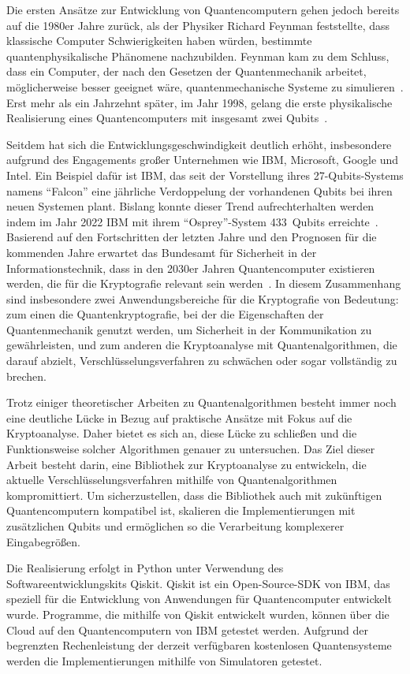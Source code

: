 \documentclass[lettersize,journal]{IEEEtran}
\begin{document}
Die ersten Ansätze zur Entwicklung von Quantencomputern gehen jedoch bereits auf die 1980er Jahre zurück,
als der Physiker Richard Feynman feststellte,
dass klassische Computer Schwierigkeiten haben würden,
bestimmte quantenphysikalische Phänomene nachzubilden.
Feynman kam zu dem Schluss, dass ein Computer,
der nach den Gesetzen der Quantenmechanik arbeitet,
möglicherweise besser geeignet wäre,
quantenmechanische Systeme zu simulieren~\cite{Feynman:1982}.
Erst mehr als ein Jahrzehnt später, im Jahr 1998,
gelang die erste physikalische Realisierung eines Quantencomputers
mit insgesamt zwei Qubits~\cite{Chuang:1998ExperimentalIO}.

Seitdem hat sich die Entwicklungsgeschwindigkeit deutlich erhöht,
insbesondere aufgrund des Engagements großer Unternehmen wie IBM, Microsoft, Google und Intel.
Ein Beispiel dafür ist IBM,
das seit der Vorstellung ihres 27-Qubits-Systems namens "`Falcon"'
eine jährliche Verdoppelung der vorhandenen Qubits bei ihren neuen Systemen plant.
Bislang konnte dieser Trend aufrechterhalten werden
indem im Jahr 2022 IBM mit ihrem "`Osprey"'-System 433~Qubits erreichte~\cite{IBM:2022}.
Basierend auf den Fortschritten der letzten Jahre und
den Prognosen für die kommenden Jahre erwartet
das Bundesamt für Sicherheit in der Informationstechnik,
dass in den 2030er Jahren Quantencomputer existieren werden,
die für die Kryptografie relevant sein werden~\cite{BSI:2023}.
In diesem Zusammenhang sind insbesondere zwei Anwendungsbereiche für die Kryptografie von Bedeutung:
zum einen die Quantenkryptografie, bei der die Eigenschaften der Quantenmechanik genutzt werden,
um Sicherheit in der Kommunikation zu gewährleisten, und
zum anderen die Kryptoanalyse mit Quantenalgorithmen, die darauf abzielt,
Verschlüsselungsverfahren zu schwächen oder sogar vollständig zu brechen.

Trotz einiger theoretischer Arbeiten zu Quantenalgorithmen
besteht immer noch eine deutliche Lücke in Bezug auf praktische Ansätze mit Fokus auf die Kryptoanalyse.
Daher bietet es sich an, diese Lücke zu schließen und die Funktionsweise solcher Algorithmen genauer zu untersuchen.
Das Ziel dieser Arbeit besteht darin, eine Bibliothek zur Kryptoanalyse zu entwickeln,
die aktuelle Verschlüsselungsverfahren mithilfe von Quantenalgorithmen kompromittiert.
Um sicherzustellen, dass die Bibliothek auch mit zukünftigen Quantencomputern kompatibel ist,
skalieren die Implementierungen mit zusätzlichen Qubits und
ermöglichen so die Verarbeitung komplexerer Eingabegrößen.

Die Realisierung erfolgt in Python unter Verwendung des Softwareentwicklungskits Qiskit.
Qiskit ist ein Open-Source-SDK von IBM,
das speziell für die Entwicklung von Anwendungen für Quantencomputer entwickelt wurde.
Programme, die mithilfe von Qiskit entwickelt wurden,
können über die Cloud auf den Quantencomputern von IBM getestet werden.
Aufgrund der begrenzten Rechenleistung der derzeit verfügbaren kostenlosen Quantensysteme
werden die Implementierungen mithilfe von Simulatoren getestet.
\end{document}
